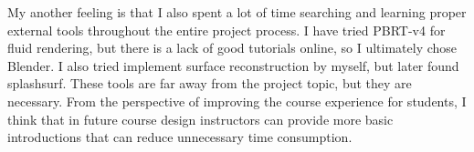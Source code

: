 \documentclass[acmlarge]{acmart}
\begin{document}
My another feeling is that I also spent a lot of time searching and learning proper external tools throughout the entire project process. 
I have tried PBRT-v4 for fluid rendering, but there is a lack of good tutorials online, so I ultimately chose Blender. 
I also tried implement surface reconstruction by myself, but later found splashsurf. 
These tools are far away from the project topic, but they are necessary. 
From the perspective of improving the course experience for students,
I think that in future course design instructors can provide more basic introductions that can 
reduce unnecessary time consumption.



{
    \small
	  
}
\end{document}
